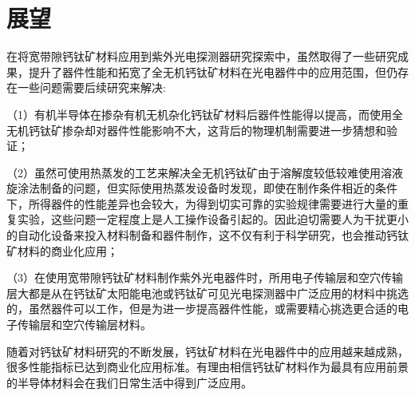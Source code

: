 \documentclass[forlib]{WHUMaster}   %
\begin{document}
{\section{展望}

在将宽带隙钙钛矿材料应用到紫外光电探测器研究探索中，虽然取得了一些研究成果，提升了器件性能和拓宽了全无机钙钛矿材料在光电器件中的应用范围，但仍存在一些问题需要后续研究来解决:

（1）有机半导体在掺杂有机无机杂化钙钛矿材料后器件性能得以提高，而使用全无机钙钛矿掺杂却对器件性能影响不大，这背后的物理机制需要进一步猜想和验证；

（2）虽然可使用热蒸发的工艺来解决全无机钙钛矿由于溶解度较低较难使用溶液旋涂法制备的问题，但实际使用热蒸发设备时发现，即使在制作条件相近的条件下，所得器件的性能差异也会较大，为得到切实可靠的实验规律需要进行大量的重复实验，这些问题一定程度上是人工操作设备引起的。因此迫切需要人为干扰更小的自动化设备来投入材料制备和器件制作，这不仅有利于科学研究，也会推动钙钛矿材料的商业化应用；

（3）在使用宽带隙钙钛矿材料制作紫外光电器件时，所用电子传输层和空穴传输层大都是从在钙钛矿太阳能电池或钙钛矿可见光电探测器中广泛应用的材料中挑选的，虽然器件可以工作，但是为进一步提高器件性能，或需要精心挑选更合适的电子传输层和空穴传输层材料。

随着对钙钛矿材料研究的不断发展，钙钛矿材料在光电器件中的应用越来越成熟，很多性能指标已达到商业化应用标准。有理由相信钙钛矿材料作为最具有应用前景的半导体材料会在我们日常生活中得到广泛应用。}


\cleardoublepage{}
{}



\backmatter
\cleardoublepage
\end{document}
